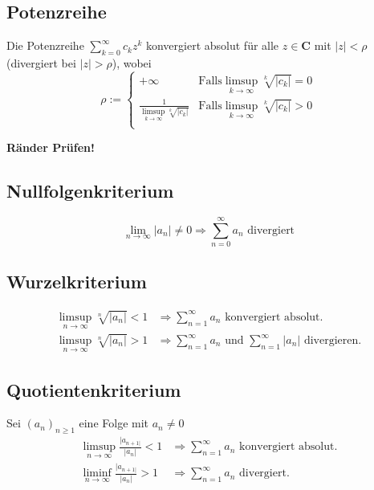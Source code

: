 \documentclass[8pt]{article}
\begin{document}
\begin{multicols*}{3}
\subsection {Potenzreihe}
Die Potenzreihe $\sum_{k = 0}^\infty c_k z^k$ konvergiert absolut für alle $z \in \mathbf{C}$
mit $|z| < \rho$ (divergiert bei $|z| > \rho$), wobei
$$
  \rho := \begin{cases}
    +\infty &\text{Falls} \limsup_{k \rightarrow \infty} \sqrt[k]{|c_k|} = 0\\
    \frac{1}{\limsup_{k \rightarrow \infty} \sqrt[k]{|c_k|}} &\text{Falls} \limsup_{k \rightarrow \infty} \sqrt[k]{|c_k|} > 0\\
  \end{cases}
$$
\begin{center}
  \color{red}
  \textbf{Ränder Prüfen!}
\end{center}
\subsection{Nullfolgenkriterium}
$$
  \lim_{n \rightarrow \infty} |a_n| \neq 0 \Rightarrow \sum_{n = 0}^\infty a_n \text{ divergiert}
$$

\subsection{Wurzelkriterium}

\begin{align*}
  \limsup_{n \rightarrow \infty} \sqrt[n]{|a_n|} < 1 &\Rightarrow \sum_{n = 1}^\infty a_n \text{ konvergiert absolut.}\\
  \limsup_{n \rightarrow \infty} \sqrt[n]{|a_n|} > 1 &\Rightarrow \sum_{n = 1}^\infty a_n \text{ und } \sum_{n = 1}^\infty |a_n| \text{ divergieren.}
\end{align*}

\subsection{Quotientenkriterium}

Sei $(a_n)_{n \geq 1}$ eine Folge mit $a_n \neq 0$
\begin{align*}
  \limsup_{n \rightarrow \infty} \frac{|a_{n+1|}}{|a_n|} < 1 &\Rightarrow \sum_{n = 1}^\infty a_n \text{ konvergiert absolut.}\\
  \liminf_{n \rightarrow \infty} \frac{|a_{n+1|}}{|a_n|} > 1 &\Rightarrow \sum_{n = 1}^\infty a_n \text{ divergiert.}
\end{align*}


\end{multicols*}
\end{document}
